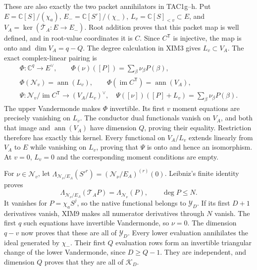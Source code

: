 These are also exactly the two packet annihilators in TAC1g--h.
Put $E=\mathbb C[S]/(\chi_a)$, $E_-=\mathbb C[S']/(\chi_-)$,
$L_v=\mathbb C[S]_{<v}\subset E$, and
$V_A=\ker(\overline{\mathcal T}_A:E\longrightarrow E_-)$.
Root addition proves that this packet map is well defined, and in
root-value coordinates it is $C$. Since $C^{\mathsf T}$ is injective,
the map is onto and $\dim V_A=q-Q$. The degree calculation in XIM3
gives $L_v\subset V_A$. The exact complex-linear pairing is
\[
\begin{gathered}
 \Phi:\mathbb C^q\longrightarrow E^\vee,\qquad
 \Phi(\nu)([P])=\sum_\beta\nu_\beta P(\beta),\\
 \Phi(\mathscr N_v)=\operatorname{ann}(L_v),\qquad
 \Phi(\operatorname{im}C^{\mathsf T})=\operatorname{ann}(V_A),\\
 \Psi:\mathscr N_v/\operatorname{im}C^{\mathsf T}
       \longrightarrow (V_A/L_v)^\vee,\quad
 \Psi([\nu])([P]+L_v)=\sum_\beta\nu_\beta P(\beta).
\end{gathered}\tag{XIM8a}
\]
The upper Vandermonde makes $\Phi$ invertible. Its first $v$ moment
equations are precisely vanishing on $L_v$. The conductor dual
functionals vanish on $V_A$, and both that image and
$\operatorname{ann}(V_A)$ have dimension $Q$, proving their equality.
Restriction therefore has exactly this kernel. Every functional on
$V_A/L_v$ extends linearly from $V_A$ to $E$ while vanishing on
$L_v$, proving that $\Psi$ is onto and hence an isomorphism.
At $v=0$, $L_v=0$ and the corresponding moment conditions are empty.

For $\nu\in\mathscr N_v$, let
$\Lambda_{\mathcal N_\nu/E_A}(S'^r)=(\mathcal N_\nu/E_A)^{(r)}(0)$.
Leibniz's finite identity proves
\[
 \Lambda_{\mathcal N_\nu/E_A}(\mathcal T_AP)
       =\Lambda_{\mathcal N_\nu}(P),\qquad \deg P\le N.
 \tag{XIM9}
\]
It vanishes for $P=\chi_aS^j$, so the native functional belongs
to $\mathscr Y_D$. If its first $D+1$ derivatives vanish, XIM9
makes all numerator derivatives through $N$ vanish. The first $q$
such equations have invertible Vandermonde, so $\nu=0$.
The dimension $q-v$ now proves that these are all of $\mathscr Y_D$.
Every lower evaluation annihilates the ideal generated by $\chi_-$.
Their first $Q$ evaluation rows form an invertible triangular change
of the lower Vandermonde, since $D\ge Q-1$. They are independent,
and dimension $Q$ proves that they are all of $\mathscr K_D$.


